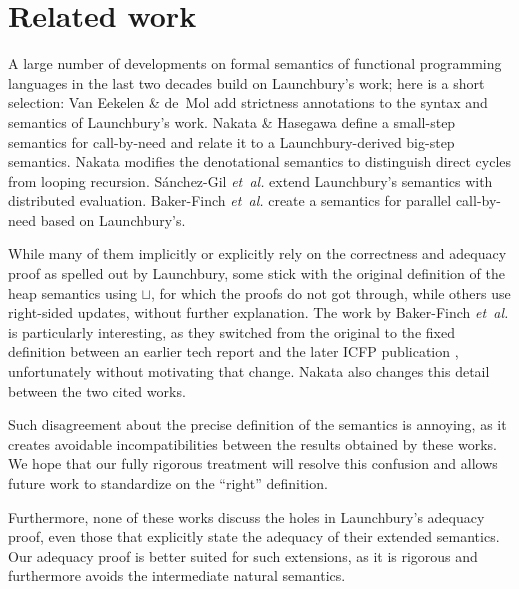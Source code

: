 \documentclass{jfp1}
\theoremstyle{nonumberbreak}
\begin{document}
\section{Related work}

A large number of developments on formal semantics of functional programming languages in the last two decades build on Launchbury’s work; here is a short selection:
Van Eekelen \& de~Mol  add strictness annotations to the syntax and semantics of Launchbury’s work.
Nakata \& Hasegawa  define a small-step semantics for call-by-need and relate it to a Launchbury-derived big-step semantics. Nakata  modifies the denotational semantics to distinguish direct cycles from looping recursion.
S{\'a}nchez-Gil {\em et~al.}  extend Launchbury's semantics with distributed evaluation.
Baker-Finch {\em et~al.}  create a semantics for parallel call-by-need based on Launchbury’s.

While many of them implicitly or explicitly rely on the correctness and adequacy proof as spelled out by Launchbury, some stick with the original definition of the heap semantics using $\sqcup$, for which the proofs do not got through, while others use right-sided updates, without further explanation. The work by Baker-Finch {\em et~al.} is particularly interesting, as they switched from the original to the fixed definition between an earlier tech report  and the later ICFP publication , unfortunately without motivating that change. Nakata also changes this detail between the two cited works.

Such disagreement about the precise definition of the semantics is annoying, as it creates avoidable incompatibilities between the results obtained by these works. We hope that our fully rigorous treatment will resolve this confusion and allows future work to standardize on the ``right'' definition.

Furthermore, none of these works discuss the holes in Launchbury’s adequacy proof, even those that explicitly state the adequacy of their extended semantics. Our adequacy proof is better suited for such extensions, as it is rigorous and furthermore avoids the intermediate natural semantics.
\end{document}
